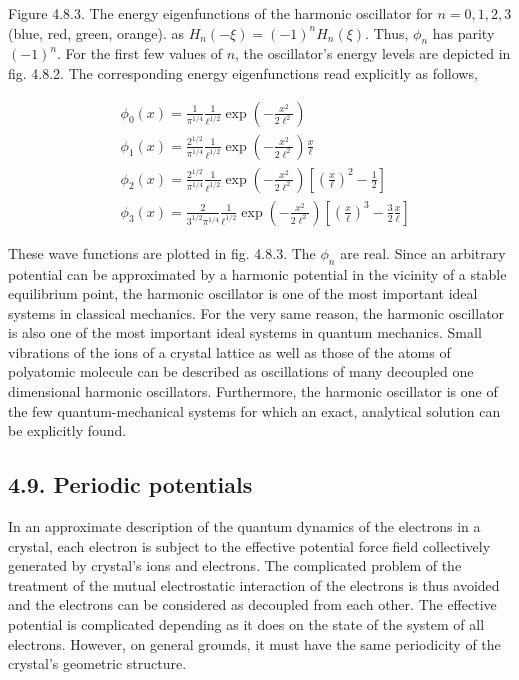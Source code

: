 \documentclass{article}
\begin{document}
Figure 4.8.3. The energy eigenfunctions of the harmonic oscillator for $n=0,1,2,3$ (blue, red, green, orange).
as $H_{n}(-\xi)=(-1)^{n} H_{n}(\xi)$. Thus, $\phi_{n}$ has parity $(-1)^{n}$.
For the first few values of $n$, the oscillator's energy levels are depicted in fig. 4.8.2. The corresponding energy eigenfunctions read explicitly as follows,
 
\begin{align*}
& \phi_{0}(x)=\frac{1}{\pi^{1 / 4}} \frac{1}{\ell^{1 / 2}} \exp \left(-\frac{x^{2}}{2 \ell^{2}}\right)  \tag{4.8.25a}\\
& \phi_{1}(x)=\frac{2^{1 / 2}}{\pi^{1 / 4}} \frac{1}{\ell^{1 / 2}} \exp \left(-\frac{x^{2}}{2 \ell^{2}}\right) \frac{x}{\ell}  \tag{4.8.25b}\\
& \phi_{2}(x)=\frac{2^{1 / 2}}{\pi^{1 / 4}} \frac{1}{\ell^{1 / 2}} \exp \left(-\frac{x^{2}}{2 \ell^{2}}\right)\left[\left(\frac{x}{\ell}\right)^{2}-\frac{1}{2}\right]  \tag{4.8.25c}\\
& \phi_{3}(x)=\frac{2}{3^{1 / 2} \pi^{1 / 4}} \frac{1}{\ell^{1 / 2}} \exp \left(-\frac{x^{2}}{2 \ell^{2}}\right)\left[\left(\frac{x}{\ell}\right)^{3}-\frac{3}{2} \frac{x}{\ell}\right] \tag{4.8.25d}
\end{align*}
 

These wave functions are plotted in fig. 4.8.3. The $\phi_{n}$ are real.
Since an arbitrary potential can be approximated by a harmonic potential in the vicinity of a stable equilibrium point, the harmonic oscillator is one of the most important ideal systems in classical mechanics. For the very same reason, the harmonic oscillator is also one of the most important ideal systems in quantum mechanics. Small vibrations of the ions of a crystal lattice as well as those of the atoms of polyatomic molecule can be described as oscillations of many decoupled one dimensional harmonic oscillators. Furthermore, the harmonic oscillator is one
of the few quantum-mechanical systems for which an exact, analytical solution can be explicitly found.

\subsection*{4.9. Periodic potentials}

In an approximate description of the quantum dynamics of the electrons in a crystal, each electron is subject to the effective potential force field collectively generated by crystal's ions and electrons. The complicated problem of the treatment of the mutual electrostatic interaction of the electrons is thus avoided and the electrons can be considered as decoupled from each other. The effective potential is complicated depending as it does on the state of the system of all electrons. However, on general grounds, it must have the same periodicity of the crystal's geometric structure.
\end{document}
